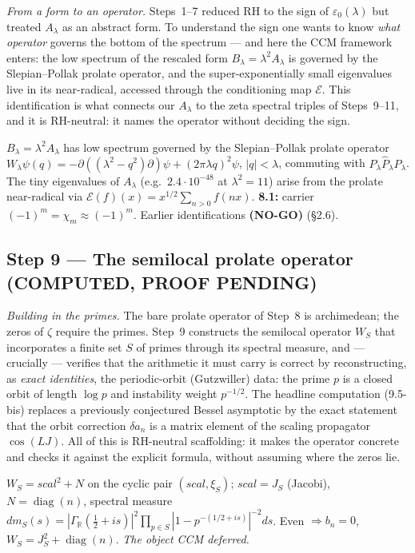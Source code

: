\documentclass[11pt]{amsart}
\theoremstyle{definition}
\theoremstyle{remark}
\newcommand{\ve}{\varepsilon}
\newcommand{\COMP}{\textbf{(COMPUTED, PROOF PENDING)}}
\newcommand{\NOGO}{\textbf{(NO-GO)}}
\begin{document}
\emph{From a form to an operator.} Steps~1--7 reduced RH to the sign of $\ve_0(\lambda)$ but
treated $A_\lambda$ as an abstract form. To understand the sign one wants to know \emph{what
operator} governs the bottom of the spectrum --- and here the CCM framework enters: the low
spectrum of the rescaled form $B_\lambda=\lambda^2A_\lambda$ is governed by the Slepian--Pollak
prolate operator, and the super-exponentially small eigenvalues live in its near-radical,
accessed through the conditioning map $\mathcal E$. This identification is what connects our
$A_\lambda$ to the zeta spectral triples of Steps~9--11, and it is RH-neutral: it names the
operator without deciding the sign.

$B_\lambda=\lambda^2A_\lambda$ has low spectrum governed by the Slepian--Pollak prolate operator
$W_\lambda\psi(q)=-\partial((\lambda^2-q^2)\partial)\psi+(2\pi\lambda q)^2\psi$, $|q|<\lambda$,
commuting with $P_\lambda\widehat P_\lambda P_\lambda$. The tiny eigenvalues of $A_\lambda$ (e.g.\
$2.4\cdot10^{-48}$ at $\lambda^2{=}11$) arise from the prolate near-radical via
$\mathcal E(f)(x)=x^{1/2}\sum_{n>0}f(nx)$. \textbf{8.1:} carrier $(-1)^m=\chi_m\approx(-1)^m$.
Earlier identifications \NOGO{} (\S2.6).

\subsection{Step 9 --- The semilocal prolate operator \COMP}

\emph{Building in the primes.} The bare prolate operator of Step~8 is archimedean; the zeros of
$\zeta$ require the primes. Step~9 constructs the semilocal operator $W_S$ that incorporates a
finite set $S$ of primes through its spectral measure, and --- crucially --- verifies that the
arithmetic it must carry is correct by reconstructing, as \emph{exact identities}, the
periodic-orbit (Gutzwiller) data: the prime $p$ is a closed orbit of length $\log p$ and
instability weight $p^{-1/2}$. The headline computation (9.5-bis) replaces a previously
conjectured Bessel asymptotic by the exact statement that the orbit correction
$\delta a_n$ is a matrix element of the scaling propagator $\cos(LJ)$. All of this is RH-neutral
scaffolding: it makes the operator concrete and checks it against the explicit formula, without
assuming where the zeros lie.

$W_S=scal^2+N$ on the cyclic pair $(scal,\xi_S)$; $scal=J_S$ (Jacobi), $N=\operatorname{diag}(n)$,
spectral measure
$dm_S(s)=|\Gamma_{\mathbb R}(\tfrac12+is)|^2\prod_{p\in S}|1-p^{-(1/2+is)}|^{-2}ds$. Even
$\Rightarrow b_n=0$, $W_S=J_S^2+\operatorname{diag}(n)$. \emph{The object CCM deferred.}
\end{document}
